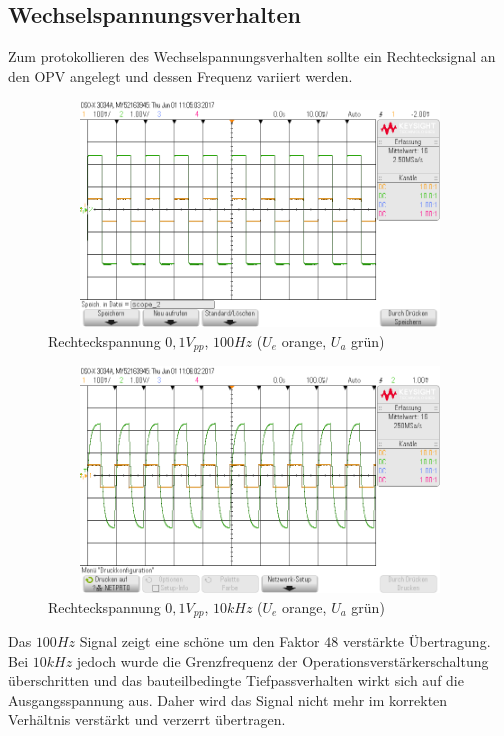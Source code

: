 \newpage
\subsection{Wechselspannungsverhalten}

Zum protokollieren des Wechselspannungsverhalten sollte ein Rechtecksignal an den OPV angelegt und dessen Frequenz variiert
werden.\\

\begin{figure}[H]
 \begin{center}
  \includegraphics[height=6cm,width=12cm]{OsziBilder/nichtInvVer_100Hz}
 \end{center}
 \caption{Rechteckspannung $0,1V_{pp}$, $100Hz$ ($U_e$ orange, $U_a$ grün)}
\end{figure}

\begin{figure}[H]
 \begin{center}
  \includegraphics[height=6cm,width=12cm]{OsziBilder/nichtInvVer_10kHz}
 \end{center}
 \caption{Rechteckspannung $0,1V_{pp}$, $10kHz$ ($U_e$ orange, $U_a$ grün)}
\end{figure}
\noindent
Das $100Hz$ Signal zeigt eine schöne um den Faktor $48$ verstärkte Übertragung. Bei $10kHz$ jedoch
wurde die Grenzfrequenz der Operationsverstärkerschaltung überschritten und das bauteilbedingte Tiefpassverhalten wirkt sich
auf die Ausgangsspannung aus. Daher wird das Signal nicht mehr im korrekten Verhältnis verstärkt und verzerrt übertragen.\\
